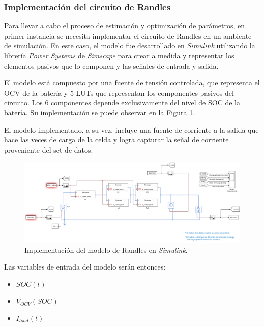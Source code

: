 \documentclass[10pt,a4paper]{article}
\begin{document}
\subsubsection{Implementación del circuito de Randles}

Para llevar a cabo el proceso de estimación y optimizaci\'on de par\'ametros, en
primer instancia se necesita implementar el circuito de Randles en un ambiente
de simulaci\'on. En este caso, el modelo fue desarrollado en \emph{Simulink}
utilizando la librer\'ia \emph{Power Systems} de \emph{Simscape} para crear a
medida y representar los elementos pasivos que lo componen y las señales de
entrada y salida.

El modelo est\'a compuesto por una fuente de tensi\'on controlada, que
representa el \acrshort{OCV} de la bater\'ia y 5 \acrshort{LUT}s que
representan los componentes pasivos del circuito. Los 6 componentes depende
exclusivamente del nivel de \acrshort{SOC} de la bater\'ia. Su implementaci\'on
se puede observar en la Figura \ref{battery_model_simulink}. 

El modelo implementado, a su vez, incluye una fuente de corriente a la salida
que hace las veces de carga de la celda y logra capturar la señal de corriente
proveniente del set de datos.

\begin{figure}[h!]
    \begin{center}
        \includegraphics[width=1\textwidth]{battery_model_simulink.png}
        \caption{Implementaci\'on del modelo de Randles en \emph{Simulink}.}
        \label{battery_model_simulink}
    \end{center}
\end{figure}
\FloatBarrier

Las variables de entrada del modelo serán entonces: 

\begin{itemize}
    \item $SOC(t)$
    \item $V_{OCV}(SOC)$
    \item $I_{load}(t)$
\end{itemize}
\end{document}
